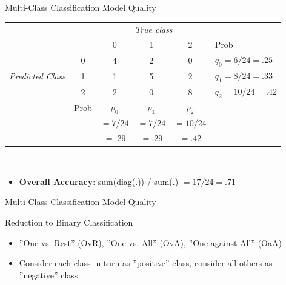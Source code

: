 \documentclass[ignorenonframetext,xcolor=x11names]{beamer}
\begin{document}
\begin{frame}{Multi-Class Classification Model Quality}
\begin{block}{}
\small
\begin{center}
\renewcommand{\arraystretch}{1.25}

\begin{tabular}{cc|ccc|l} \hline
     & & \multicolumn{3}{c|}{\emph{True class}} \\
                 &   & 0 & 1 & 2 & Prob \\ \hline
\multirow{3}{1.1cm}{\emph{Predicted Class}} & 0 & 4 & 2 & 0 & $q_0 = 6/24  = .25$ \\ 
                 & 1 & 1 & 5 & 2 & $q_1 = 8/24  = .33$ \\
                 & 2 & 2 & 0 & 8 & $q_2 = 10/24 = .42$ \\ \hline
     & Prob & $p_0$ & $p_1$ & $p_2$ &  \\
     &      & $=7/24$ & $=7/24$ & $=10/24$ &  \\ 
     &      & $=.29$ & $=.29$ & $=.42$ &  \\ \hline
\end{tabular} \\
\end{center}
\end{block}
\begin{itemize}
   \item \textbf{Overall Accuracy}: sum(diag(.)) / sum(.) $=17/24=.71$
\end{itemize}
\end{frame}

\begin{frame}{Multi-Class Classification Model Quality}
\begin{block}{Reduction to Binary Classification}
\begin{itemize}
  \item ''One vs. Rest'' (OvR), ''One vs. All'' (OvA), ''One against All'' (OaA)
  \item Consider each class in turn as ''positive'' class, consider all others as ''negative'' class
\end{itemize}
\end{block}
\end{frame}
\end{document}
